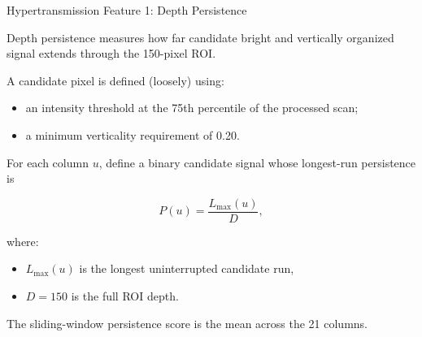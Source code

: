 \documentclass[aspectratio=169]{beamer}
\begin{document}
\begin{frame}{Hypertransmission Feature 1: Depth Persistence}

Depth persistence measures how far candidate bright and vertically organized
signal extends through the 150-pixel ROI.

A candidate pixel is defined (loosely) using:

\begin{itemize}
    \item an intensity threshold at the 75th percentile of the processed scan;
    \item a minimum verticality requirement of 0.20.
\end{itemize}

For each column \(u\), define a binary candidate signal whose longest-run persistence is

\[
P(u)
=
\frac{
L_{\max}(u)
}{
D
},
\]

where:

\begin{itemize}
    \item \(L_{\max}(u)\) is the longest uninterrupted candidate run,
    \item \(D=150\) is the full ROI depth.
\end{itemize}

The sliding-window persistence score is the mean across the 21 columns.

\end{frame}
\end{document}
